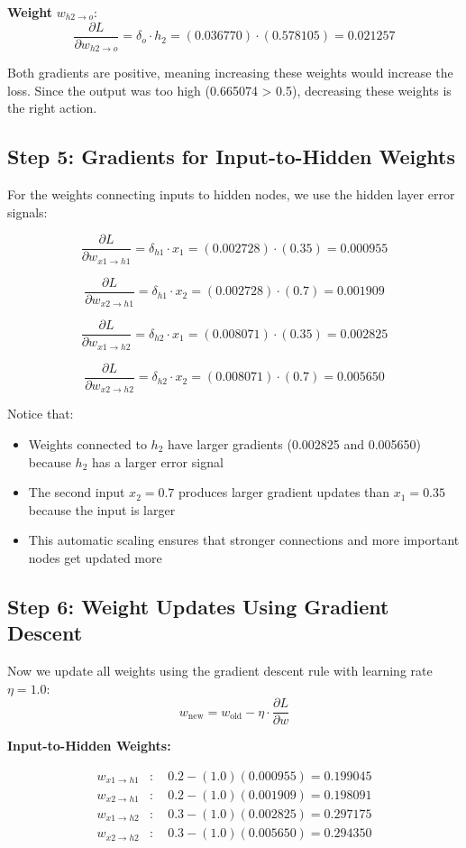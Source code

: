\documentclass[12pt]{article}
\begin{document}
\noindent\textbf{Weight } $w_{h2 \to o}$:
\[
\frac{\partial L}{\partial w_{h2 \to o}} = \delta_o \cdot h_2 = (0.036770) \cdot (0.578105) = 0.021257
\]

Both gradients are positive, meaning increasing these weights would increase the loss. Since the output was too high (0.665074 > 0.5), decreasing these weights is the right action.

\subsection*{Step 5: Gradients for Input-to-Hidden Weights}

For the weights connecting inputs to hidden nodes, we use the hidden layer error signals:

\[
\frac{\partial L}{\partial w_{x1 \to h1}} = \delta_{h1} \cdot x_1 = (0.002728) \cdot (0.35) = 0.000955
\]

\[
\frac{\partial L}{\partial w_{x2 \to h1}} = \delta_{h1} \cdot x_2 = (0.002728) \cdot (0.7) = 0.001909
\]

\[
\frac{\partial L}{\partial w_{x1 \to h2}} = \delta_{h2} \cdot x_1 = (0.008071) \cdot (0.35) = 0.002825
\]

\[
\frac{\partial L}{\partial w_{x2 \to h2}} = \delta_{h2} \cdot x_2 = (0.008071) \cdot (0.7) = 0.005650
\]

Notice that:
\begin{itemize}
    \item Weights connected to $h_2$ have larger gradients (0.002825 and 0.005650) because $h_2$ has a larger error signal
    \item The second input $x_2 = 0.7$ produces larger gradient updates than $x_1 = 0.35$ because the input is larger
    \item This automatic scaling ensures that stronger connections and more important nodes get updated more
\end{itemize}

\subsection*{Step 6: Weight Updates Using Gradient Descent}

Now we update all weights using the gradient descent rule with learning rate $\eta = 1.0$:
\[
w_{\text{new}} = w_{\text{old}} - \eta \cdot \frac{\partial L}{\partial w}
\]

\noindent\textbf{Input-to-Hidden Weights:}

\begin{align*}
w_{x1 \to h1} &: \quad 0.2 - (1.0)(0.000955) = 0.199045 \\
w_{x2 \to h1} &: \quad 0.2 - (1.0)(0.001909) = 0.198091 \\
w_{x1 \to h2} &: \quad 0.3 - (1.0)(0.002825) = 0.297175 \\
w_{x2 \to h2} &: \quad 0.3 - (1.0)(0.005650) = 0.294350
\end{align*}
\end{document}
